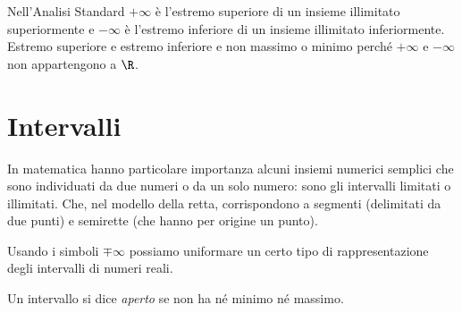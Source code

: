 \vspace{.5em}
Nell'Analisi Standard \(+\infty\) è l'estremo superiore di un insieme 
illimitato superiormente e \(-\infty\) è l'estremo inferiore di un insieme 
illimitato inferiormente.
Estremo superiore e estremo inferiore e non massimo o minimo perché 
\(+\infty\) e \(-\infty\) non appartengono a \(\R\).

\section{Intervalli}
\label{sec:topologiaintervalli}

% 
% 

In matematica hanno particolare importanza alcuni insiemi numerici semplici 
che sono individuati da due numeri o da un solo numero: sono gli intervalli 
limitati o illimitati.
Che, nel modello della retta, corrispondono a segmenti (delimitati da due 
punti) e semirette (che hanno per origine un punto).

\vspace{.5em}

\vspace{.5em}
Usando i simboli \(\mp \infty\) possiamo uniformare un certo tipo di 
rappresentazione degli intervalli di numeri reali.

\begin{newdef}{}{}
Un intervallo si dice \emph{aperto} se non ha né minimo né massimo.
\end{newdef}

